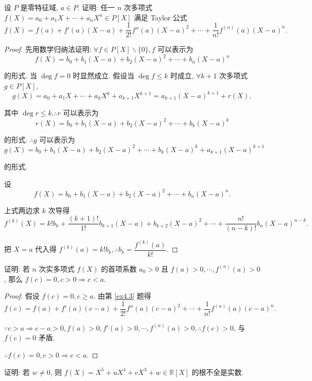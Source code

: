\documentclass[color=black,device=normal,lang=cn,mode=geye]{elegantnote}
\begin{document}
\begin{exercise}\label{ex4.3}
    设 $P$ 是零特征域, $a\in P$. 证明: 任一 $n$ 次多项式 $f(X)=a_0+a_1X+\cdots+a_nX^n\in P[X]$ 满足 Taylor 公式
    \[f(X)=f(a)+f'(a)(X-a)+\dfrac{1}{2!}f''(a)(X-a)^2+\cdots+\dfrac{1}{n!}f^{(n)}(a)(X-a)^n.\]
\end{exercise}
\begin{proof}
    先用数学归纳法证明: $\forall f\in P[X]\backslash\{0\},f$ 可以表示为
    \[f(X)=b_0+b_1(X-a)+b_2(X-a)^2+\cdots+b_n(X-a)^n\]

    的形式. 当 $\deg f=0$ 时显然成立. 假设当 $\deg f\leq k$ 时成立, $\forall k+1$ 次多项式 $g\in P[X]$,
    \[g(X)=a_0+a_1X+\cdots+a_kX^k+a_{k+1}X^{k+1}=a_{k+1}(X-a)^{k+1}+r(X),\]

    其中 $\deg r\leq k.\therefore r$ 可以表示为
    \[r(X)=b_0+b_1(X-a)+b_2(X-a)^2+\cdots+b_k(X-a)^k\]

    的形式. $\therefore g$ 可以表示为
    \[g(X)=b_0+b_1(X-a)+b_2(X-a)^2+\cdots+b_k(X-a)^k+a_{k+1}(X-a)^{k+1}\]

    的形式.

    设
    \[f(X)=b_0+b_1(X-a)+b_2(X-a)^2+\cdots+b_n(X-a)^n.\]

    上式两边求 $k$ 次导得
    \[f^{(k)}(X)=k!b_k+\dfrac{(k+1)!}{1!}b_{k+1}(X-a)+b_{k+2}(X-a)^2+\cdots+\dfrac{n!}{(n-k)!}b_n(X-a)^{n-k}.\]
    
    把 $X=a$ 代入得 $f^{(k)}(a)=k!b_k,\therefore b_k=\dfrac{f^{(k)}(a)}{k!}$.
\end{proof}
\begin{exercise}%
    证明: 若 $n$ 次实多项式 $f(X)$ 的首项系数 $a_0>0$ 且 $f(a)>0,\cdots,f^{(n)}(a)>0$, 那么 $f(c)=0,c>0\Rightarrow c<a$.
\end{exercise}
\begin{proof}
    假设 $f(c)=0,c\geq a$. 由第 \ref{ex4.3} 题得
    \[f(c)=f(a)+f'(a)(c-a)+\dfrac{1}{2!}f''(a)(c-a)^2+\cdots+\dfrac{1}{n!}f^{(n)}(a)(c-a)^n.\]

    $\because c>a\Rightarrow c-a>0,f(a)>0,f'(a)>0,\cdots,f^{(n)}(a)>0,\therefore f(c)>0$, 与 $f(c)=0$ 矛盾.

    $\therefore f(c)=0,c>0\Rightarrow c<a$.
\end{proof}
\begin{exercise}%
    证明: 若 $w\neq0$, 则 $f(X)=X^5+uX^4+vX^3+w\in\mathbb{R}[X]$ 的根不全是实数.
\end{exercise}
\end{document}
